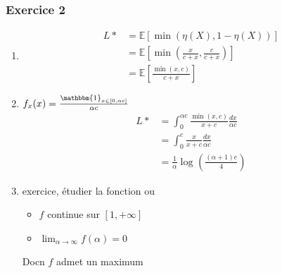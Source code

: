 \documentclass{article}
\theoremstyle{plain}%
\theoremstyle{definition}
\theoremstyle{remark}
\begin{document}
\subsubsection{Exercice 2}
\begin{enumerate}
    \item \begin{align*}
        L* &= \mathbb{E}[\min(\eta (X) , 1 - \eta (X))] \\
            &= \mathbb{E}[\min (\frac{x}{c+x} , \frac{c}{c+x})] \\ 
            &= \mathbb{E}[ \frac{\min (x,c)}{ c+x}]
    \end{align*}
    \item $ f_x(x) = \frac{\mathbbm{1}_{x \in [0, \alpha c]}}{\alpha c} $ 
    \begin{align*}
        L* &= \int_{0}^{\alpha c} \frac{\min (x,c)}{x + c} \frac{dx}{\alpha c}\\
            &= \int_{0}^{c} \frac{x}{x+c} \frac{dx}{\alpha c} \\ 
            &= \frac{1}{\alpha } \log_{} ( \frac{(\alpha +1) e}{4})
    \end{align*} 
    \item exercice, étudier la fonction ou \begin{itemize}
        \item $ f $ continue sur $ [1, +\infty ] $ 
        \item $ \lim_{\alpha  \to \infty} f(\alpha ) = 0 $ 
    \end{itemize}
    Docn $ f $ admet un maximum 
\end{enumerate}
\end{document}
